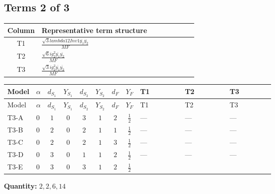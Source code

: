 \documentclass[8pt]{article}
\begin{document}
\begin{landscape}
\subsection*{Terms 2 of 3}
\begin{center}
\begin{tabular}{@{}c >{\raggedright\arraybackslash}p{0.82\linewidth}@{}}
\toprule
Column & Representative term structure \\
\midrule
T1 & \(\displaystyle \frac{\sqrt{3} lambda12Inv1 \overline{y_{1}} \overline{y_{2}}}{MF}\) \\
\midrule
T2 & \(\displaystyle \frac{\sqrt{6} i g_{2}^{2} \overline{y_{1}} \overline{y_{2}}}{MF}\) \\
\midrule
T3 & \(\displaystyle \frac{\sqrt{3} i g_{2}^{2} \overline{y_{1}} \overline{y_{2}}}{MF}\) \\
\midrule
\bottomrule
\end{tabular}
\end{center}
\smallskip
\tiny
\begin{longtable}{@{}llcccccc >{\raggedright\arraybackslash}p{0.21\linewidth} >{\raggedright\arraybackslash}p{0.21\linewidth} >{\raggedright\arraybackslash}p{0.21\linewidth}@{}}
\toprule
Model & $\alpha$ & $d_{S_1}$ & $Y_{S_1}$ & $d_{S_2}$ & $Y_{S_2}$ & $d_F$ & $Y_F$ & T1 & T2 & T3 \\
\midrule
\endfirsthead
\toprule
Model & $\alpha$ & $d_{S_1}$ & $Y_{S_1}$ & $d_{S_2}$ & $Y_{S_2}$ & $d_F$ & $Y_F$ & T1 & T2 & T3 \\
\midrule
\endhead
T3-A & $0$ & $1$ & $0$ & $3$ & $1$ & $2$ & $\frac{1}{2}$ & --- & --- & --- \\
\midrule
T3-B & $0$ & $2$ & $0$ & $2$ & $1$ & $1$ & $\frac{1}{2}$ & --- & --- & --- \\
\midrule
T3-C & $0$ & $2$ & $0$ & $2$ & $1$ & $3$ & $\frac{1}{2}$ & --- & --- & --- \\
\midrule
T3-D & $0$ & $3$ & $0$ & $1$ & $1$ & $2$ & $\frac{1}{2}$ & --- & --- & --- \\
\midrule
T3-E & $0$ & $3$ & $0$ & $3$ & $1$ & $2$ & $\frac{1}{2}$ & \scriptsize\adjustbox{max width=\linewidth}{$\begin{gathered} \frac{\sqrt{3} lambda12Inv1 \overline{y_{1}} \overline{y_{2}}}{6 MF}\end{gathered}$} & \scriptsize\adjustbox{max width=\linewidth}{$\begin{gathered} \frac{\sqrt{6} i g_{2}^{2} \overline{y_{1}} \overline{y_{2}}}{3 MF}\end{gathered}$} & \scriptsize\adjustbox{max width=\linewidth}{$\begin{gathered} \frac{\sqrt{3} i g_{2}^{2} \overline{y_{1}} \overline{y_{2}}}{6 MF}\end{gathered}$} \\
\midrule
\bottomrule
\end{longtable}
\clearpage
\noindent\textbf{Quantity: }$\mathrm{2,2,6,14}$\par\smallskip

\end{landscape}
\end{document}
